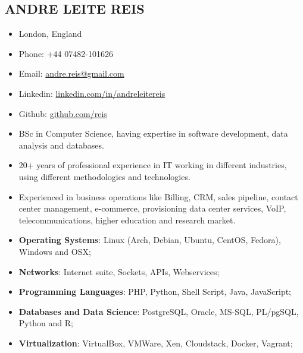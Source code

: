 \documentclass[margin,a4paper]{res}
\def\tightlist{}
\begin{document}
{\hypertarget{andre-leite-reis}{%
\subsection{ANDRE LEITE REIS}\label{andre-leite-reis}}

\begin{itemize}
\tightlist
\item
  London, England
\item
  Phone: +44 07482-101626
  \item
  Email: \href{mailto:andre.reis@gmail.com}{andre.reis@gmail.com}
\item
  Linkedin:
  \href{https://linkedin.com/in/andreleitereis}{linkedin.com/in/andreleitereis}
\item
  Github: \href{https://github.com/reis}{github.com/reis}
\end{itemize}

\begin{itemize}
  \hypertarget{summary}{%
  \section{Summary}\label{summary}}
  
  \tightlist
\item
  BSc in Computer Science, having expertise in software development,
  data analysis and databases.
\item
  20+ years of professional experience in IT working in different
  industries, using different methodologies and technologies.
\item
  Experienced in business operations like Billing, CRM, sales pipeline,
  contact center management, e-commerce, provisioning data center
  services, VoIP, telecommunications, higher education and research
  market.
\end{itemize}

\begin{itemize}
  \hypertarget{skills-base}{%
  \section{Skills Base}\label{skills-base}}
  \tightlist
\item
  \textbf{Operating Systems}: Linux (Arch, Debian, Ubuntu, CentOS,
  Fedora), Windows and OSX;
\item
  \textbf{Networks}: Internet suite, Sockets, APIs, Webservices;
\item
  \textbf{Programming Languages}: PHP, Python, Shell Script, Java,
  JavaScript;
\item
  \textbf{Databases and Data Science}: PostgreSQL, Oracle, MS-SQL,
  PL/pgSQL, Python and R;
\item
  \textbf{Virtualization}: VirtualBox, VMWare, Xen, Cloudstack, Docker,
  Vagrant;
\end{itemize}

}
\end{document}
